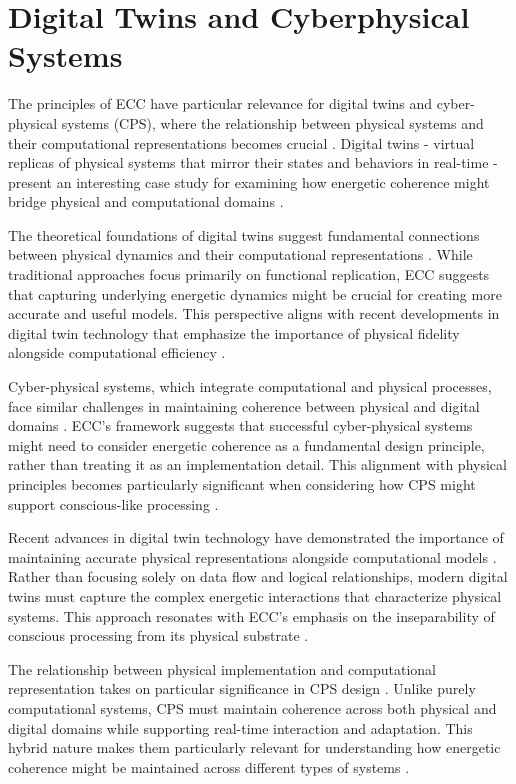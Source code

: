 \section{Digital Twins and Cyberphysical Systems}

The principles of ECC have particular relevance for digital twins and cyber-physical systems (CPS), where the relationship between physical systems and their computational representations becomes crucial \cite{Fuller2020}. Digital twins - virtual replicas of physical systems that mirror their states and behaviors in real-time - present an interesting case study for examining how energetic coherence might bridge physical and computational domains \cite{Jones2020}.

The theoretical foundations of digital twins suggest fundamental connections between physical dynamics and their computational representations \cite{Madni2019}. While traditional approaches focus primarily on functional replication, ECC suggests that capturing underlying energetic dynamics might be crucial for creating more accurate and useful models. This perspective aligns with recent developments in digital twin technology that emphasize the importance of physical fidelity alongside computational efficiency \cite{Minerva2020}.

Cyber-physical systems, which integrate computational and physical processes, face similar challenges in maintaining coherence between physical and digital domains \cite{Lee2018}. ECC's framework suggests that successful cyber-physical systems might need to consider energetic coherence as a fundamental design principle, rather than treating it as an implementation detail. This alignment with physical principles becomes particularly significant when considering how CPS might support conscious-like processing \cite{Rajkumar2018}.

Recent advances in digital twin technology have demonstrated the importance of maintaining accurate physical representations alongside computational models \cite{Grieves2021}. Rather than focusing solely on data flow and logical relationships, modern digital twins must capture the complex energetic interactions that characterize physical systems. This approach resonates with ECC's emphasis on the inseparability of conscious processing from its physical substrate \cite{Liu2021}.

The relationship between physical implementation and computational representation takes on particular significance in CPS design \cite{Tao2019}. Unlike purely computational systems, CPS must maintain coherence across both physical and digital domains while supporting real-time interaction and adaptation. This hybrid nature makes them particularly relevant for understanding how energetic coherence might be maintained across different types of systems \cite{Uhlemann2017}.

